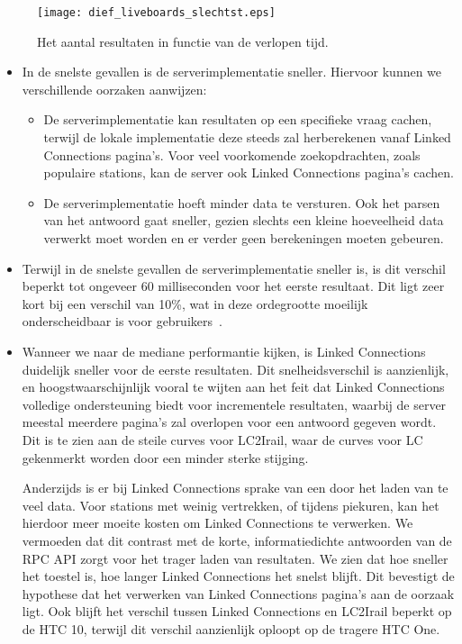 \begin{figure}[h]
	\centering
	\texttt{[image: dief\_liveboards\_slechtst.eps]}
	\caption[Aantal resultaten liveboards in functie van de tijd (90e percentiel)]{Het aantal resultaten in functie van de verlopen tijd.}
	\label{fig:liveboardsDiefSlechtst}
\end{figure}


\begin{itemize}
    \item In de snelste gevallen is de serverimplementatie sneller. Hiervoor kunnen we verschillende oorzaken aanwijzen: 
	\begin{itemize}
		\item De serverimplementatie kan resultaten op een specifieke vraag cachen, terwijl de lokale implementatie deze steeds zal herberekenen vanaf Linked Connections pagina's. Voor veel voorkomende zoekopdrachten, zoals populaire stations, kan de server ook Linked Connections pagina's cachen.
		\item De serverimplementatie hoeft minder data te versturen. Ook het parsen van het antwoord gaat sneller, gezien slechts een kleine hoeveelheid data verwerkt moet worden en er verder geen berekeningen moeten gebeuren.
	\end{itemize}

	\item Terwijl in de snelste gevallen de serverimplementatie sneller is, is dit verschil beperkt tot ongeveer 60 milliseconden voor het eerste resultaat. Dit ligt zeer kort bij een verschil van 10\%, wat in deze ordegrootte moeilijk onderscheidbaar is voor gebruikers~\citep{miller68}. %
	
	\item Wanneer we naar de mediane performantie kijken, is Linked Connections duidelijk sneller voor de eerste resultaten. Dit snelheidsverschil is aanzienlijk, en hoogstwaarschijnlijk vooral te wijten aan het feit dat Linked Connections volledige ondersteuning biedt voor incrementele resultaten, waarbij de server meestal meerdere pagina's zal overlopen voor een  antwoord gegeven wordt. Dit is te zien aan de steile curves voor LC2Irail, waar de curves voor LC gekenmerkt worden door een minder sterke stijging. 
	
	Anderzijds is er bij Linked Connections sprake van een  door het laden van te veel data. Voor stations met weinig vertrekken, of tijdens piekuren, kan het hierdoor meer moeite kosten om Linked Connections te verwerken. We vermoeden dat dit contrast met de korte, informatiedichte antwoorden van de RPC API zorgt voor het trager laden van resultaten. We zien dat hoe sneller het toestel is, hoe langer Linked Connections het snelst blijft. Dit bevestigt de hypothese dat het verwerken van Linked Connections pagina's aan de oorzaak ligt. Ook blijft het verschil tussen Linked Connections en LC2Irail beperkt op de HTC 10, terwijl dit verschil aanzienlijk oploopt op de tragere HTC One.
	

\end{itemize}
